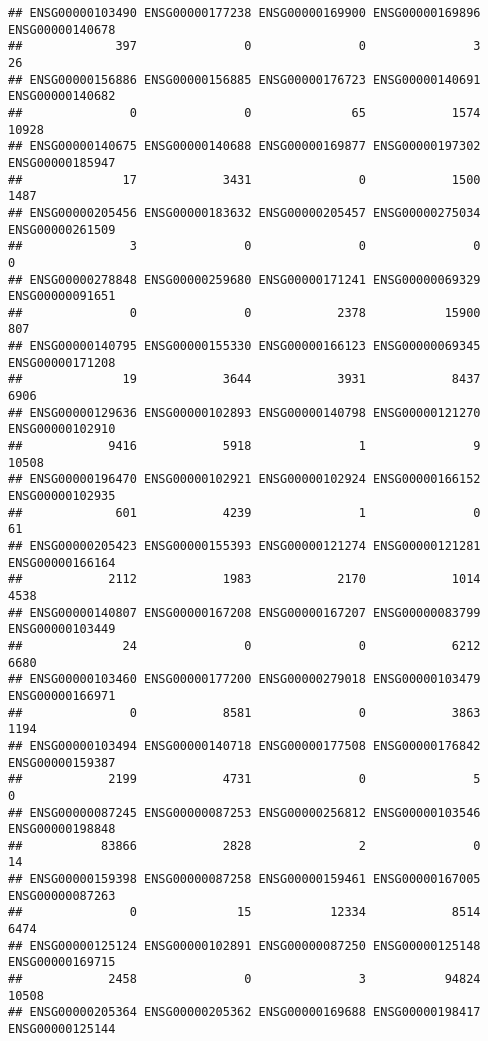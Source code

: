 \documentclass[
]{article}
\begin{document}
\begin{verbatim}
## ENSG00000103490 ENSG00000177238 ENSG00000169900 ENSG00000169896 ENSG00000140678 
##             397               0               0               3              26 
## ENSG00000156886 ENSG00000156885 ENSG00000176723 ENSG00000140691 ENSG00000140682 
##               0               0              65            1574           10928 
## ENSG00000140675 ENSG00000140688 ENSG00000169877 ENSG00000197302 ENSG00000185947 
##              17            3431               0            1500            1487 
## ENSG00000205456 ENSG00000183632 ENSG00000205457 ENSG00000275034 ENSG00000261509 
##               3               0               0               0               0 
## ENSG00000278848 ENSG00000259680 ENSG00000171241 ENSG00000069329 ENSG00000091651 
##               0               0            2378           15900             807 
## ENSG00000140795 ENSG00000155330 ENSG00000166123 ENSG00000069345 ENSG00000171208 
##              19            3644            3931            8437            6906 
## ENSG00000129636 ENSG00000102893 ENSG00000140798 ENSG00000121270 ENSG00000102910 
##            9416            5918               1               9           10508 
## ENSG00000196470 ENSG00000102921 ENSG00000102924 ENSG00000166152 ENSG00000102935 
##             601            4239               1               0              61 
## ENSG00000205423 ENSG00000155393 ENSG00000121274 ENSG00000121281 ENSG00000166164 
##            2112            1983            2170            1014            4538 
## ENSG00000140807 ENSG00000167208 ENSG00000167207 ENSG00000083799 ENSG00000103449 
##              24               0               0            6212            6680 
## ENSG00000103460 ENSG00000177200 ENSG00000279018 ENSG00000103479 ENSG00000166971 
##               0            8581               0            3863            1194 
## ENSG00000103494 ENSG00000140718 ENSG00000177508 ENSG00000176842 ENSG00000159387 
##            2199            4731               0               5               0 
## ENSG00000087245 ENSG00000087253 ENSG00000256812 ENSG00000103546 ENSG00000198848 
##           83866            2828               2               0              14 
## ENSG00000159398 ENSG00000087258 ENSG00000159461 ENSG00000167005 ENSG00000087263 
##               0              15           12334            8514            6474 
## ENSG00000125124 ENSG00000102891 ENSG00000087250 ENSG00000125148 ENSG00000169715 
##            2458               0               3           94824           10508 
## ENSG00000205364 ENSG00000205362 ENSG00000169688 ENSG00000198417 ENSG00000125144 

\end{verbatim}
\end{document}
